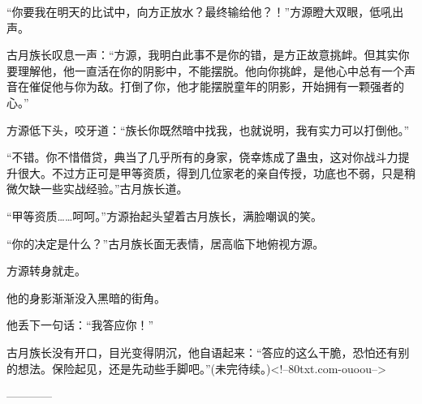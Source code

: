 \begin{this_body}
“你要我在明天的比试中，向方正放水？最终输给他？！”方源瞪大双眼，低吼出声。

古月族长叹息一声：“方源，我明白此事不是你的错，是方正故意挑衅。但其实你要理解他，他一直活在你的阴影中，不能摆脱。他向你挑衅，是他心中总有一个声音在催促他与你为敌。打倒了你，他才能摆脱童年的阴影，开始拥有一颗强者的心。”

方源低下头，咬牙道：“族长你既然暗中找我，也就说明，我有实力可以打倒他。”

“不错。你不惜借贷，典当了几乎所有的身家，侥幸炼成了蛊虫，这对你战斗力提升很大。不过方正可是甲等资质，得到几位家老的亲自传授，功底也不弱，只是稍微欠缺一些实战经验。”古月族长道。

“甲等资质……呵呵。”方源抬起头望着古月族长，满脸嘲讽的笑。

“你的决定是什么？”古月族长面无表情，居高临下地俯视方源。

方源转身就走。

他的身影渐渐没入黑暗的街角。

他丢下一句话：“我答应你！”

古月族长没有开口，目光变得阴沉，他自语起来：“答应的这么干脆，恐怕还有别的想法。保险起见，还是先动些手脚吧。”(未完待续。)<!--80txt.com-ouoou-->

------------

\end{this_body}

